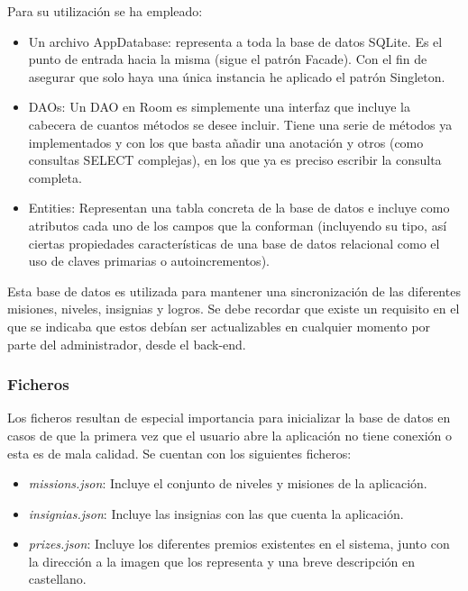 \documentclass[twoside]{report}
\begin{document}
Para su utilización se ha empleado:

\begin{itemize}

\item Un archivo AppDatabase: representa a toda la base de datos SQLite. Es el punto de entrada hacia la misma (sigue el patrón Facade). Con el fin de asegurar que solo haya una única instancia he aplicado el patrón Singleton.
\item DAOs: Un DAO en Room es simplemente una interfaz que incluye la cabecera de cuantos métodos se desee incluir. Tiene una serie de métodos ya implementados y con los que basta añadir una anotación y otros (como consultas SELECT complejas), en los que ya es preciso escribir la consulta completa.
\item Entities: Representan una tabla concreta de la base de datos e incluye como atributos cada uno de los campos que la conforman (incluyendo su tipo, así ciertas propiedades características de una base de datos relacional como el uso de claves primarias o autoincrementos).
\end{itemize}

Esta base de datos es utilizada para mantener una sincronización de las diferentes misiones, niveles, insignias y logros. Se debe recordar que existe un requisito en el que se indicaba que estos debían ser actualizables en cualquier momento por parte del administrador, desde el back-end.

\subsubsection{Ficheros}

Los ficheros resultan de especial importancia para inicializar la base de datos en casos de que la primera vez que el usuario abre la aplicación no tiene conexión o esta es de mala calidad. Se cuentan con los siguientes ficheros:

\begin{itemize}
\item \textit{missions.json}: Incluye el conjunto de niveles y misiones de la aplicación. 

\item \textit{insignias.json}: Incluye las insignias con las que cuenta la aplicación.

\item \textit{prizes.json}: Incluye los diferentes premios existentes en el sistema, junto con la dirección a la imagen que los representa y una breve descripción en castellano.

\end{itemize}
\end{document}
